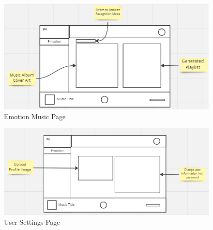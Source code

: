 \begin{figure}[H]
    \centering
    \includegraphics[width=12cm]{Images/emotion.png}
    \caption{Emotion Music Page}
    \label{fig:emotion}
\end{figure}
\begin{figure}[H]
    \centering
    \includegraphics[width=12cm]{Images/user-settings.png}
    \caption{User Settings Page}
    \label{fig:usr-settings}
\end{figure}

\newpage

